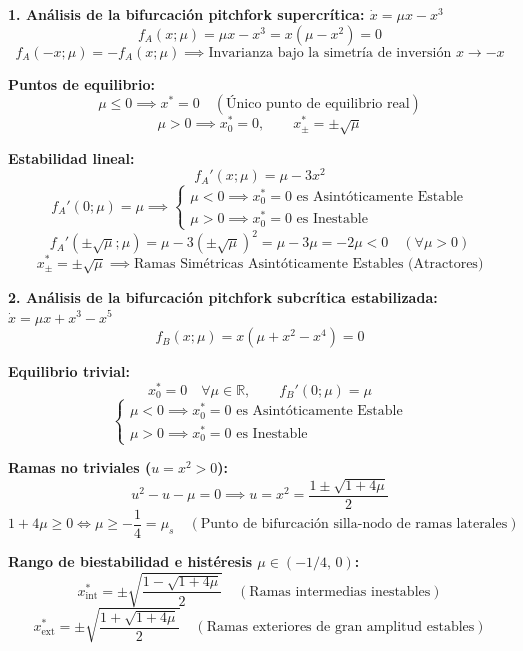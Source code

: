 \documentclass[11pt,a4paper]{article}
\newenvironment{solucion}[1][Solución Detallada]{%
    \vspace{1.5mm}%
    \noindent{\large\textbf{Solución:}}\par\vspace{1.5mm}%
}{%
    \par\vspace{3mm}%
}
\begin{document}
\begin{solucion}

\textbf{\large 1. Análisis de la bifurcación pitchfork supercrítica: $\dot{x} = \mu x - x^3$}
\[
f_A(x; \mu) = \mu x - x^3 = x(\mu - x^2) = 0
\]
\[
\boxed{f_A(-x; \mu) = -f_A(x; \mu) \implies \text{Invarianza bajo la simetría de inversión } x \to -x}
\]

\textbf{Puntos de equilibrio:}
\[
\mu \le 0 \implies \boxed{x^* = 0 \quad (\text{Único punto de equilibrio real})}
\]
\[
\mu > 0 \implies \boxed{x_0^* = 0, \qquad x_{\pm}^* = \pm\sqrt{\mu}}
\]

\textbf{Estabilidad lineal:}
\[
f_A'(x; \mu) = \mu - 3x^2
\]
\[
f_A'(0; \mu) = \mu \implies 
\begin{cases}
\mu < 0 \implies \boxed{x_0^* = 0 \text{ es Asintóticamente Estable}} \\
\mu > 0 \implies \boxed{x_0^* = 0 \text{ es Inestable}}
\end{cases}
\]
\[
f_A'(\pm\sqrt{\mu}; \mu) = \mu - 3(\pm\sqrt{\mu})^2 = \mu - 3\mu = -2\mu < 0 \quad (\forall \mu > 0)
\]
\[
\boxed{x_{\pm}^* = \pm\sqrt{\mu} \implies \text{Ramas Simétricas Asintóticamente Estables (Atractores)}}
\]

\vspace{3.5mm}

\textbf{\large 2. Análisis de la bifurcación pitchfork subcrítica estabilizada: $\dot{x} = \mu x + x^3 - x^5$}
\[
f_B(x; \mu) = x(\mu + x^2 - x^4) = 0
\]

\textbf{Equilibrio trivial:}
\[
x_0^* = 0 \quad \forall \mu \in \mathbb{R}, \qquad f_B'(0; \mu) = \mu
\]
\[
\begin{cases}
\mu < 0 \implies \boxed{x_0^* = 0 \text{ es Asintóticamente Estable}} \\
\mu > 0 \implies \boxed{x_0^* = 0 \text{ es Inestable}}
\end{cases}
\]

\textbf{Ramas no triviales ($u = x^2 > 0$):}
\[
u^2 - u - \mu = 0 \implies u = x^2 = \frac{1 \pm \sqrt{1 + 4\mu}}{2}
\]
\[
1 + 4\mu \ge 0 \iff \boxed{\mu \ge -\frac{1}{4} = \mu_s \quad (\text{Punto de bifurcación silla-nodo de ramas laterales})}
\]

\textbf{Rango de biestabilidad e histéresis $\mu \in (-1/4, \, 0)$:}
\[
\boxed{x_{\text{int}}^* = \pm\sqrt{\frac{1 - \sqrt{1 + 4\mu}}{2}} \quad (\text{Ramas intermedias inestables})}
\]
\[
\boxed{x_{\text{ext}}^* = \pm\sqrt{\frac{1 + \sqrt{1 + 4\mu}}{2}} \quad (\text{Ramas exteriores de gran amplitud estables})}
\]


\end{solucion}
\end{document}
